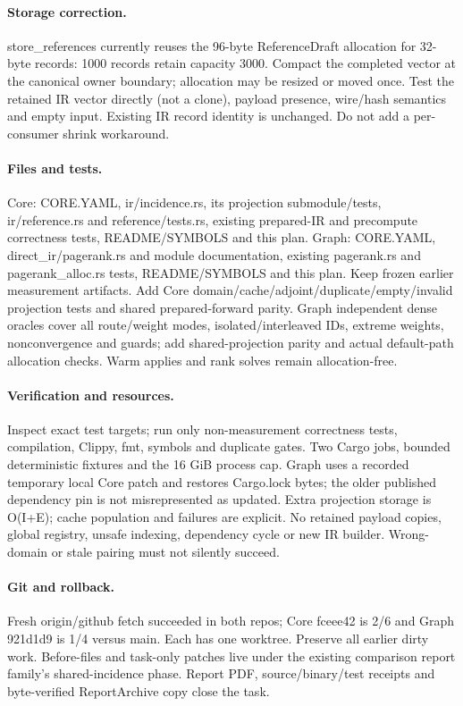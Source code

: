 \documentclass[11pt,a4paper]{article}
\begin{document}
\paragraph{Storage correction.} store\_references currently reuses the 96-byte
ReferenceDraft allocation for 32-byte records: 1000 records retain capacity 3000.
Compact the completed vector at the canonical owner boundary; allocation may be
resized or moved once. Test the retained IR vector directly (not a clone), payload
presence, wire/hash semantics and empty input. Existing IR record identity is
unchanged. Do not add a per-consumer shrink workaround.
\paragraph{Files and tests.} Core: CORE.YAML, ir/incidence.rs, its projection
submodule/tests, ir/reference.rs and reference/tests.rs, existing prepared-IR
and precompute correctness tests, README/SYMBOLS and this plan. Graph: CORE.YAML,
direct\_ir/pagerank.rs and module documentation, existing pagerank.rs and
pagerank\_alloc.rs tests, README/SYMBOLS and this plan. Keep frozen earlier
measurement artifacts. Add Core domain/cache/adjoint/duplicate/empty/invalid
projection tests and shared prepared-forward parity. Graph independent dense
oracles cover all route/weight modes, isolated/interleaved IDs, extreme weights,
nonconvergence and guards; add shared-projection parity and actual default-path
allocation checks. Warm applies and rank solves remain allocation-free.
\paragraph{Verification and resources.} Inspect exact test targets; run only
non-measurement correctness tests, compilation, Clippy, fmt, symbols and duplicate
gates. Two Cargo jobs, bounded deterministic fixtures and the 16 GiB process cap.
Graph uses a recorded temporary local Core patch and restores Cargo.lock bytes;
the older published dependency pin is not misrepresented as updated. Extra
projection storage is O(I+E); cache population and failures are explicit. No
retained payload copies, global registry, unsafe indexing, dependency cycle or
new IR builder. Wrong-domain or stale pairing must not silently succeed.
\paragraph{Git and rollback.} Fresh origin/github fetch succeeded in both repos;
Core fceee42 is 2/6 and Graph 921d1d9 is 1/4 versus main. Each has one worktree.
Preserve all earlier dirty work. Before-files and task-only patches live under
the existing comparison report family's shared-incidence phase. Report PDF,
source/binary/test receipts and byte-verified ReportArchive copy close the task.
\end{document}
